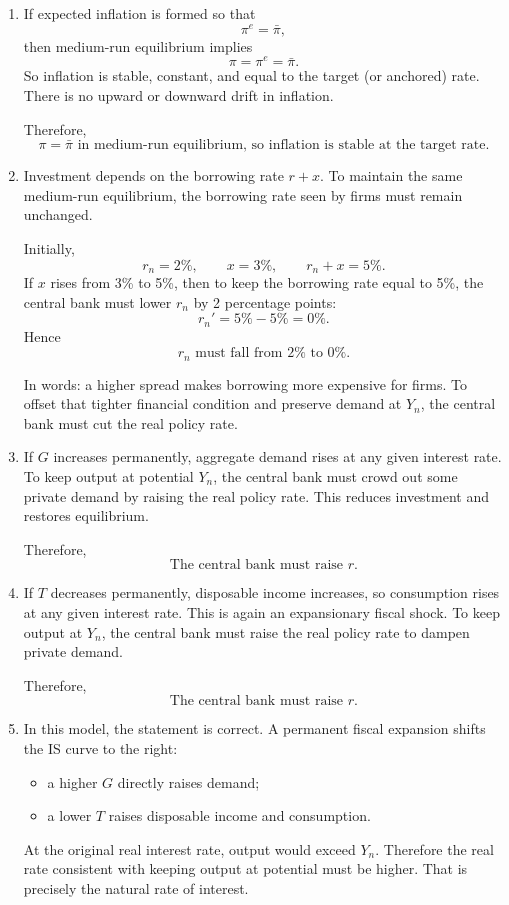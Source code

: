 \documentclass[12pt]{article}
\begin{document}
\begin{enumerate}[label=(\alph*)]
    \item
    If expected inflation is formed so that
    \[
    \pi^e=\bar{\pi},
    \]
    then medium-run equilibrium implies
    \[
    \pi=\pi^e=\bar{\pi}.
    \]
    So inflation is stable, constant, and equal to the target (or anchored) rate. There is no upward or downward drift in inflation.

    Therefore,
    \[
    \boxed{\pi=\bar{\pi}\text{ in medium-run equilibrium, so inflation is stable at the target rate.}}
    \]

    \item
    Investment depends on the borrowing rate \(r+x\). To maintain the same medium-run equilibrium, the borrowing rate seen by firms must remain unchanged.

    Initially,
    \[
    r_n=2\%,
    \qquad
    x=3\%,
    \qquad
    r_n+x=5\%.
    \]
    If \(x\) rises from 3\% to 5\%, then to keep the borrowing rate equal to 5\%, the central bank must lower \(r_n\) by 2 percentage points:
    \[
    r_n'=5\%-5\%=0\%.
    \]
    Hence
    \[
    \boxed{r_n \text{ must fall from }2\%\text{ to }0\%.}
    \]

    In words: a higher spread makes borrowing more expensive for firms. To offset that tighter financial condition and preserve demand at \(Y_n\), the central bank must cut the real policy rate.

    \item
    If \(G\) increases permanently, aggregate demand rises at any given interest rate. To keep output at potential \(Y_n\), the central bank must crowd out some private demand by raising the real policy rate. This reduces investment and restores equilibrium.

    Therefore,
    \[
    \boxed{\text{The central bank must raise } r.}
    \]

    \item
    If \(T\) decreases permanently, disposable income increases, so consumption rises at any given interest rate. This is again an expansionary fiscal shock. To keep output at \(Y_n\), the central bank must raise the real policy rate to dampen private demand.

    Therefore,
    \[
    \boxed{\text{The central bank must raise } r.}
    \]

    \item
    In this model, the statement is correct. A permanent fiscal expansion shifts the IS curve to the right:
    \begin{itemize}[leftmargin=*]
        \item a higher \(G\) directly raises demand;
        \item a lower \(T\) raises disposable income and consumption.
    \end{itemize}
    At the original real interest rate, output would exceed \(Y_n\). Therefore the real rate consistent with keeping output at potential must be higher. That is precisely the natural rate of interest.


\end{enumerate}
\end{document}
